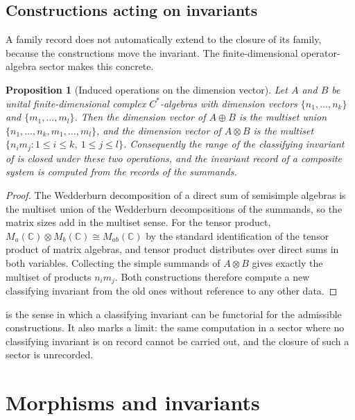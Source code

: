 \documentclass[11pt,letterpaper]{article}
\newtheorem{proposition}[theorem]{Proposition}
\theoremstyle{definition}
\theoremstyle{remark}
\begin{document}
\subsection{Constructions acting on invariants}
\label{sec:constructions-on-invariants}

A family record does not automatically extend to the closure of its family, because the constructions move the invariant. The finite-dimensional operator-algebra sector makes this concrete.

\begin{proposition}[Induced operations on the dimension vector]
\label{prop:induced}
Let $A$ and $B$ be unital finite-dimensional complex $C^*$-algebras with dimension vectors $\{n_1, \dots, n_k\}$ and $\{m_1, \dots, m_l\}$. Then the dimension vector of $A \oplus B$ is the multiset union $\{n_1, \dots, n_k, m_1, \dots, m_l\}$, and the dimension vector of $A \otimes B$ is the multiset $\{n_i m_j \colon 1 \leq i \leq k,\ 1 \leq j \leq l\}$. Consequently the range of the classifying invariant of  is closed under these two operations, and the invariant record of a composite system is computed from the records of the summands.
\end{proposition}

\begin{proof}
The Wedderburn decomposition of a direct sum of semisimple algebras is the multiset union of the Wedderburn decompositions of the summands, so the matrix sizes add in the multiset sense. For the tensor product, $M_a(\mathbb{C}) \otimes M_b(\mathbb{C}) \cong M_{ab}(\mathbb{C})$ by the standard identification of the tensor product of matrix algebras, and tensor product distributes over direct sums in both variables. Collecting the simple summands of $A \otimes B$ gives exactly the multiset of products $n_i m_j$. Both constructions therefore compute a new classifying invariant from the old ones without reference to any other data.
\end{proof}

 is the sense in which a classifying invariant can be functorial for the admissible constructions. It also marks a limit: the same computation in a sector where no classifying invariant is on record cannot be carried out, and the closure of such a sector is unrecorded.

\section{Morphisms and invariants}
\label{sec:morphisms}
\end{document}
